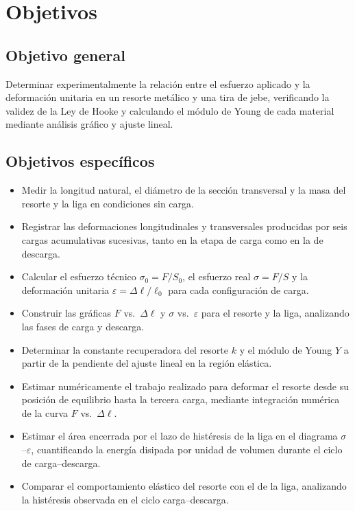 
\section{Objetivos}

\subsection{Objetivo general}

Determinar experimentalmente la relación entre el esfuerzo aplicado y la deformación
unitaria en un resorte metálico y una tira de jebe, verificando la validez de la Ley de
Hooke y calculando el módulo de Young de cada material mediante análisis gráfico y
ajuste lineal.

\subsection{Objetivos específicos}

\begin{itemize}
    \item Medir la longitud natural, el diámetro de la sección transversal y la masa
    del resorte y la liga en condiciones sin carga.

    \item Registrar las deformaciones longitudinales y transversales producidas por
    seis cargas acumulativas sucesivas, tanto en la etapa de carga como en la de
    descarga.

    \item Calcular el esfuerzo técnico $\sigma_0 = F/S_0$, el esfuerzo real
    $\sigma = F/S$ y la deformación unitaria $\varepsilon = \Delta\ell/\ell_0$
    para cada configuración de carga.

    \item Construir las gráficas $F$ vs.\ $\Delta\ell$ y $\sigma$ vs.\ $\varepsilon$
    para el resorte y la liga, analizando las fases de carga y descarga.

    \item Determinar la constante recuperadora del resorte $k$ y el módulo de Young $Y$
    a partir de la pendiente del ajuste lineal en la región elástica.

    \item Estimar numéricamente el trabajo realizado para deformar el resorte desde su
    posición de equilibrio hasta la tercera carga, mediante integración numérica de la
    curva $F$ vs.\ $\Delta\ell$.

    \item Estimar el área encerrada por el lazo de histéresis de la liga en el
    diagrama $\sigma$--$\varepsilon$, cuantificando la energía disipada por
    unidad de volumen durante el ciclo de carga--descarga.

    \item Comparar el comportamiento elástico del resorte con el de la liga, analizando
    la histéresis observada en el ciclo carga--descarga.
\end{itemize}